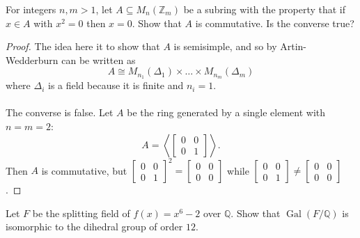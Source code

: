 \documentclass{article}
\newenvironment{problem}[2][Problem]{\begin{trivlist}
\item[\hskip \labelsep {\bfseries #1}\hskip \labelsep {\bfseries #2.}]}{\end{trivlist}}
\newcommand{\Q}{\mathbb Q}
\newcommand{\Gal}{\operatorname{Gal}}
\begin{document}
\begin{problem}{4}
  For integers $n ,m > 1$, let $A \subseteq M_n(\mathbb Z_m)$ be a subring with the property that if $x \in A$ with $x^2 = 0$ then $x = 0$. Show that $A$ is commutative. Is the converse true?
\end{problem}

\begin{proof}
  The idea here it to show that $A$ is semisimple, and so by Artin-Wedderburn
  can be written as \[
    A \cong M_{n_1}(\Delta_1) \times \hdots \times M_{n_m}(\Delta_m)
  \] where $\Delta_i$ is a field because it is finite and $n_i = 1$.
  \\~\\
  The converse is false. Let $A$ be the ring generated by a single element with $n = m = 2$: \[
    A = \left\langle\begin{bmatrix}0 & 0\\0 & 1\end{bmatrix}\right\rangle.
  \]  Then $A$ is commutative, but
  $\begin{bmatrix}0 & 0\\0 & 1\end{bmatrix}^2 = \begin{bmatrix}0 & 0\\0 & 0\end{bmatrix}$ while $\begin{bmatrix}0 & 0\\0 & 1\end{bmatrix} \neq \begin{bmatrix}0 & 0\\0 & 0\end{bmatrix}$.
\end{proof}
\pagebreak

\begin{problem}{5}
  Let $F$ be the splitting field of $f(x) = x^6 - 2$ over $\Q$.
  Show that $\Gal(F/\Q)$ is isomorphic to the dihedral group of order $12$.
\end{problem}
\end{document}
